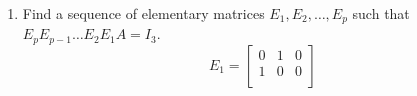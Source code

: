\documentclass{report}
\begin{document}
{\begin{enumerate} [label=(\alph*)]
\begin{align*}
\begin{array}{ccc;{2pt/2pt}ccc}
            0 & 1 & 2 & 1 & 0 & 0\\
            0 & 0 & 2 & 3 & -4 & 1\\
          \end{array}
          \right]       \\
          \xrightarrow[r_2-r_3]{}
          \left[
          \begin{array}{ccc;{2pt/2pt}ccc}  
            1 & 0 & 3 & 0 & 1 & 0\\
            0 & 1 & 0 & -2 & 4 & -1\\
            0 & 0 & 2 & 3 & -4 & 1\\
          \end{array}
          \right] \xrightarrow[r_3 \times  \frac{1}{2}]{}
          \left[
          \begin{array}{ccc;{2pt/2pt}ccc}  
            1 & 0 & 3 & 0 & 1 & 0\\
            0 & 1 & 0 & -2 & 4 & -1\\
            0 & 0 & 1 & \frac{3}{2} & -2 & \frac{1}{2}\\
          \end{array}
          \right]\\
          \xrightarrow[r_1-3r_2]{}
          \left[
          \begin{array}{ccc;{2pt/2pt}ccc}  
            1 & 0 & 0 & -\frac{9}{2} & 7 & -\frac{3}{2}\\
            0 & 1 & 0 & -2 & 4 & -1\\
            0 & 0 & 1 & \frac{3}{2} & -2 & \frac{1}{2}\\
          \end{array}
          \right] \implies A^{-1}= \begin{bmatrix}
          - \frac{9}{2} & 7 & - \frac{3}{2}\\
          -2 & 4 & -1\\
          \frac{3}{2} & -2 & \frac{1}{2}\\
          \end{bmatrix}\\
  .\end{align*}
  \item  Find a sequence of elementary matrices $E_1,E_2,\ldots, E_p$ such that $E_p E_{p-1}\ldots E_2E_1A =I_3$.\\
          \[
          E_1 = \begin{bmatrix}
          0 & 1 & 0\\
          1 & 0 & 0\\

\end{bmatrix}\]
\end{enumerate}}
\end{document}
